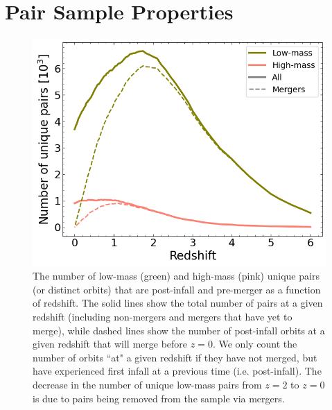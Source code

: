 \documentclass[twocolumn,linenumbers]{aastex631}
\begin{document}
\section{Pair Sample Properties}
\begin{figure}[htb]
    \begin{center}
    \includegraphics[width=\columnwidth]{plots/bet-on-it/6_paircount.png}
    \caption{The number of low-mass (green) and high-mass (pink) unique pairs (or distinct orbits) that are post-infall and pre-merger as a function of redshift. 
    The solid lines show the total number of pairs at a given redshift (including non-mergers and mergers that have yet to merge), while dashed lines show the number of post-infall orbits at a given redshift that will merge before $z=0$.
    We only count the number of orbits ``at" a given redshift if they have not merged, but have experienced first infall at a previous time (i.e. post-infall). 
    The decrease in the number of unique low-mass pairs from $z=2$ to $z=0$ is due to pairs being removed from the sample via mergers.
    }
    \label{fig:numorbits}
    \end{center}
\end{figure}
\end{document}
